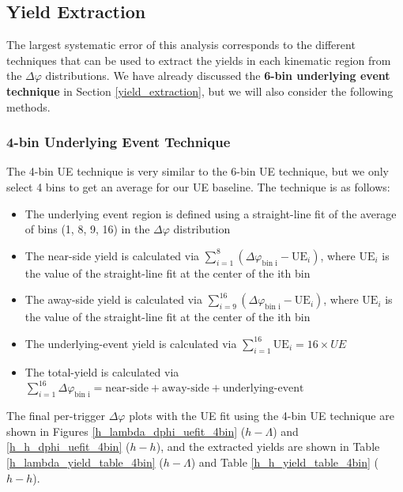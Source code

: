 \documentclass[ALICE,manyauthors]{ALICE_analysis_notes}
\begin{document}
\subsection{Yield Extraction}
The largest systematic error of this analysis corresponds to the different techniques that can be used to extract the yields in each kinematic region from the $\Delta\varphi$ distributions. We have already discussed the \textbf{6-bin underlying event technique} in Section \ref{yield_extraction}, but we will also consider the following methods. 

\subsubsection{4-bin Underlying Event Technique}
\label{4bin}
The 4-bin UE technique is very similar to the 6-bin UE technique, but we only select 4 bins to get an average for our UE baseline. The technique is as follows:

\begin{itemize}
\item The underlying event region is defined using a straight-line fit of the average of bins (1, 8, 9, 16) in the $\Delta\varphi$ distribution
\item The near-side yield is calculated via $\sum_{i=1}^{8} (\Delta\varphi_\text{bin i} - \text{UE}_i)$, where $\text{UE}_i$ is the value of the straight-line fit at the center of the ith bin
\item The away-side yield is calculated via $\sum_{i=9}^{16} (\Delta\varphi_\text{bin i} - \text{UE}_i)$, where $\text{UE}_i$ is the value of the straight-line fit at the center of the ith bin
\item The underlying-event yield is calculated via $\sum_{i=1}^{16} \text{UE}_i = 16 \times UE$
\item The total-yield is calculated via $\sum_{i=1}^{16} \Delta\varphi_\text{bin i} = \text{near-side} + \text{away-side} + \text{underlying-event}$
\end{itemize}

The final per-trigger $\Delta\varphi$ plots with the UE fit using the 4-bin UE technique are shown in Figures \ref{h_lambda_dphi_uefit_4bin} ($h-\Lambda$) and \ref{h_h_dphi_uefit_4bin} ($h-h$), and the extracted yields are shown in Table \ref{h_lambda_yield_table_4bin} ($h-\Lambda$) and Table \ref{h_h_yield_table_4bin} ($h-h$).
\end{document}
